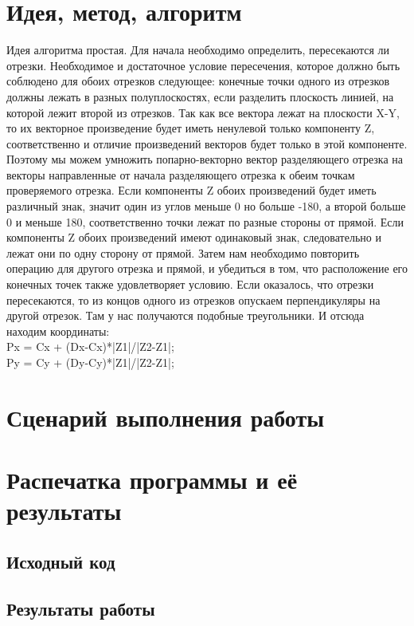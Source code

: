 \documentclass[12pt]{article}
\begin{document}
\section{Идея, метод, алгоритм}
{\large 
Идея алгоритма простая. Для начала необходимо определить, пересекаются ли отрезки. 
Необходимое и достаточное условие пересечения, которое должно быть соблюдено для 
обоих отрезков следующее: конечные точки одного из отрезков должны лежать в 
разных полуплоскостях, если разделить плоскость линией, на которой лежит второй из отрезков.
Так как все вектора лежат на плоскости X-Y, то их векторное произведение будет 
иметь ненулевой только компоненту Z, соответственно и отличие произведений векторов 
будет только в этой компоненте. Поэтому мы можем умножить попарно-векторно вектор 
разделяющего отрезка на векторы направленные от начала разделяющего отрезка к обеим точкам проверяемого отрезка. 
Если компоненты Z обоих произведений будет иметь различный знак, значит один из 
углов меньше 0 но больше -180, а второй больше 0 и меньше 180, соответственно 
точки лежат по разные стороны от прямой. Если компоненты Z обоих произведений имеют 
одинаковый знак, следовательно и лежат они по одну сторону от прямой.
Затем нам необходимо повторить операцию для другого отрезка и прямой, и убедиться 
в том, что расположение его конечных точек также удовлетворяет условию.
Если оказалось, что отрезки пересекаются, то из концов одного из отрезков опускаем 
перпендикуляры на другой отрезок. Там у нас получаются подобные треугольники. И 
отсюда находим координаты: \\
Px = Cx + (Dx-Cx)*|Z1|/|Z2-Z1|; \\
Py = Cy + (Dy-Cy)*|Z1|/|Z2-Z1|; \\

}

\section{Сценарий выполнения работы}

\section{Распечатка программы и её результаты}

\subsection{Исходный код}


\subsection{Результаты работы}
% 
\end{document}
